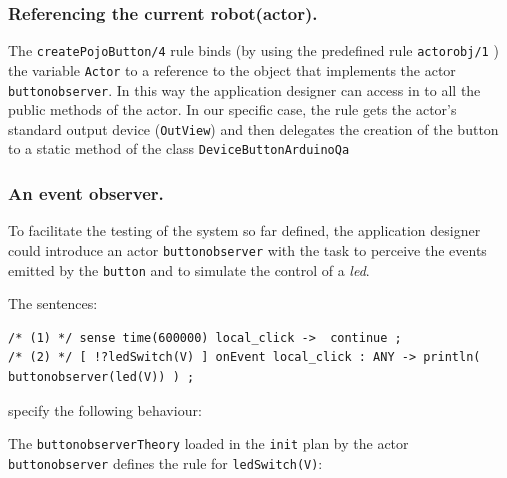 

\subsubsection{Referencing the current robot(actor).}
The \texttt{createPojoButton/4} rule binds (by using the predefined rule \texttt{actorobj/1} ) the variable \texttt{Actor} to a reference to the \java{} object that implements the actor \texttt{buttonobserver}. In this way the application designer can access in \prolog{} to all the public methods of the actor.  In our specific case, the rule gets the actor's standard output device (\texttt{OutView}) and then delegates the creation of the button  to a static method of the  \java{} class \texttt{DeviceButtonArduinoQa}


\subsubsection{An event observer.}
To facilitate the testing of the system so far defined, the application designer could introduce an actor \texttt{buttonobserver} with the task to perceive the events emitted by the \texttt{button} and to simulate the control of a \textit{led}.  

  

The sentences:

\begin{Verbatim}[fontsize=\scriptsize, frame=single]
/* (1) */ sense time(600000) local_click ->  continue ;
/* (2) */ [ !?ledSwitch(V) ] onEvent local_click : ANY -> println( buttonobserver(led(V)) ) ;
\end{Verbatim}

specify the following behaviour:

\medskip 
\scriptsize
{}
\normalsize
\medskip

The \texttt{buttonobserverTheory} loaded in the \texttt{init} plan by the actor \texttt{buttonobserver} defines the rule for \texttt{ledSwitch(V)}:

